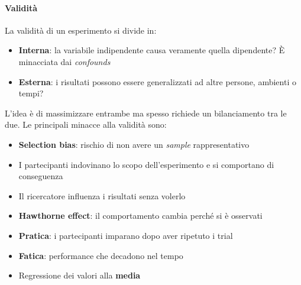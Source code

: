 \paragraph{Validità} La validità di un esperimento si divide in:
\begin{itemize}
	\item \textbf{Interna}: la variabile indipendente causa veramente quella dipendente? È minacciata dai \textit{confounds}
	\item \textbf{Esterna}: i risultati possono essere generalizzati ad altre persone, ambienti o tempi?
\end{itemize}
L'idea è di massimizzare entrambe ma spesso richiede un bilanciamento tra le due. Le principali minacce alla validità sono:
\begin{itemize}
	\item \textbf{Selection bias}: rischio di non avere un \textit{sample} rappresentativo
	\item I partecipanti indovinano lo scopo dell'esperimento e si comportano di conseguenza
	\item Il ricercatore influenza i risultati senza volerlo
	\item \textbf{Hawthorne effect}: il comportamento cambia perché si è osservati
	\item \textbf{Pratica}: i partecipanti imparano dopo aver ripetuto i trial
	\item \textbf{Fatica}: performance che decadono nel tempo
	\item Regressione dei valori alla \textbf{media}
\end{itemize}